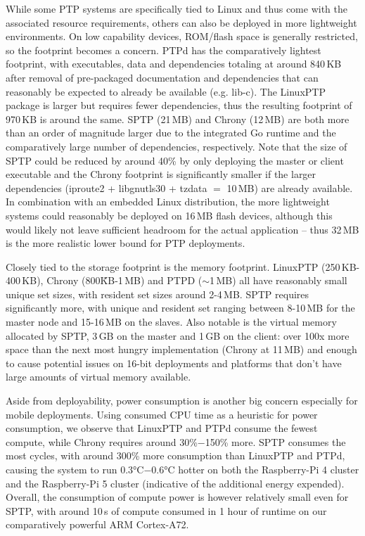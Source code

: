 While some PTP systems are specifically tied to Linux and thus come with the associated resource requirements, others can also be deployed in more lightweight environments. On low capability devices, ROM/flash space is generally restricted, so the footprint becomes a concern. PTPd has the comparatively lightest footprint, with executables, data and dependencies totaling at around 840\,KB after removal of pre-packaged documentation and dependencies that can reasonably be expected to already be available (e.g. lib-c). The LinuxPTP package is larger but requires fewer dependencies, thus the resulting footprint of 970\,KB is around the same. SPTP (21\,MB) and Chrony (12\,MB) are both more than an order of magnitude larger due to the integrated Go runtime and the comparatively large number of dependencies, respectively. Note that the size of SPTP could be reduced by around 40\% by only deploying the master or client executable and the Chrony footprint is significantly smaller if the larger dependencies (iproute2 + libgnutls30 + tzdata $=$ 10\,MB) are already available. In combination with an embedded Linux distribution, the more lightweight systems could reasonably be deployed on 16\,MB flash devices, although this would likely not leave sufficient headroom for the actual application -- thus 32\,MB is the more realistic lower bound for PTP deployments.

Closely tied to the storage footprint is the memory footprint. LinuxPTP (250\,KB-400\,KB), Chrony (800\~KB-1\,MB) and PTPD ($\sim$1\,MB) all have reasonably small unique set sizes, with resident set sizes around 2-4\,MB. SPTP requires significantly more, with unique and resident set ranging between 8-10\,MB for the master node and 15-16\,MB on the slaves. Also notable is the virtual memory allocated by SPTP, 3\,GB on the master and 1\,GB on the client: over 100x more space than the next most hungry implementation (Chrony at 11\,MB) and enough to cause potential issues on 16-bit deployments and platforms that don't have large amounts of virtual memory available.

Aside from deployability, power consumption is another big concern especially for mobile deployments. Using consumed CPU time as a heuristic for power consumption, we observe that LinuxPTP and PTPd consume the fewest compute, while Chrony requires around 30\%$-$150\% more. SPTP consumes the most cycles, with around 300\% more consumption than LinuxPTP and PTPd, causing the system to run 0.3°C$-$0.6°C hotter on both the Raspberry-Pi 4 cluster and the Raspberry-Pi 5 cluster (indicative of the additional energy expended). Overall, the consumption of compute power is however relatively small even for SPTP, with around 10\,s of compute consumed in 1 hour of runtime on our comparatively powerful ARM Cortex-A72.


